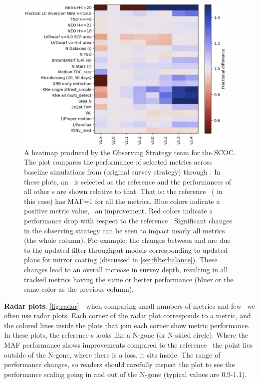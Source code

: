 \begin{figure}
  \centering
    \includegraphics[width=0.95\textwidth]{figures/v1-v34heatmap.png}
\caption{A heatmap produced by the Observing Strategy team for the SCOC. The plot compares the performance of selected metrics across baseline simulations from  (original survey strategy) through . In these plots, an \opsim\ is selected as the reference and the performances of all other \opsim s are shown relative to that. That is: the reference \opsim\ ( in this case) has MAF=1 for all the metrics. Blue colors indicate a positive metric value, \ie\ an improvement. Red colors indicate a performance drop with respect to the reference \opsim. Significant changes in the observing strategy can be seen to impact nearly all metrics (the whole column). For example: the changes between  and  are due to the updated filter throughput models corresponding to updated plans for mirror coating (discussed in \autoref{sec:filterbalance}). These changes lead to an overall increase in survey depth, resulting in all tracked metrics having the same or better performance (bluer or the same color as the previous column).}
\label{fig:heatmap}
\end{figure}


\FloatBarrier

{\bf Radar plots}: \autoref{fig:radar} - when comparing small numbers of metrics and few \opsim\ we often use radar plots. Each corner of the radar plot corresponds to a metric, and the colored lines inside the plots that join each corner show metric performance. In these plots, the reference \opsim s looks like a N-gone (or N-sided circle). Where the MAF performance shows improvements compared to the reference \opsim\ the point lies outside of the N-gone, where there is a loss, it sits inside. The range of performance changes, so readers should carefully inspect the plot to see the performance scaling going in and out of the N-gone (typical values are 0.9-1.1). 

